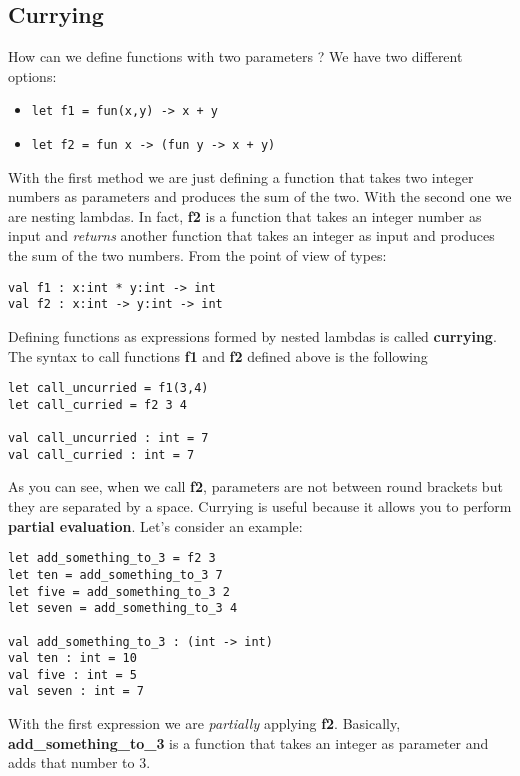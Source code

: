 \subsection{Currying}
How can we define functions with two parameters ? We have two different options:
\begin{itemize}
    \item
    \begin{lstlisting}
let f1 = fun(x,y) -> x + y
    \end{lstlisting}
    
    \item 
    \begin{lstlisting}
let f2 = fun x -> (fun y -> x + y)
    \end{lstlisting}
\end{itemize}
With the first method we are just defining a function that takes two integer numbers as parameters and produces the sum of the two. With the second one we are nesting lambdas. In fact, \textbf{f2} is a function that takes an integer number as input and \textit{returns} another function that takes an integer as input and produces the sum of the two numbers. From the point of view of types:
\begin{lstlisting}
val f1 : x:int * y:int -> int
val f2 : x:int -> y:int -> int
\end{lstlisting}
Defining functions as expressions formed by nested lambdas is called \textbf{currying}.\newline
The syntax to call functions \textbf{f1} and \textbf{f2} defined above is the following
\begin{lstlisting}
let call_uncurried = f1(3,4)
let call_curried = f2 3 4

val call_uncurried : int = 7
val call_curried : int = 7
\end{lstlisting}
As you can see, when we call \textbf{f2}, parameters are not between round brackets but they are separated by a space. \newline
Currying is useful because it allows you to perform \textbf{partial evaluation}. Let's consider an example:
\begin{lstlisting}
let add_something_to_3 = f2 3
let ten = add_something_to_3 7
let five = add_something_to_3 2
let seven = add_something_to_3 4

val add_something_to_3 : (int -> int)
val ten : int = 10
val five : int = 5
val seven : int = 7
\end{lstlisting}
With the first expression we are \textit{partially} applying \textbf{f2}. Basically, \textbf{add\_something\_to\_3} is a function that takes an integer as parameter and adds that number to 3.\newline
